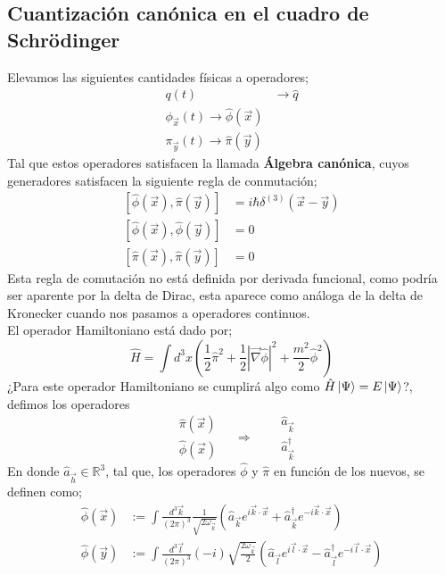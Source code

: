 \documentclass[../main.tex]{subfiles}
\begin{document}
\subsection{Cuantización canónica en el cuadro de Schrödinger}
Elevamos las siguientes cantidades físicas a operadores;
\begin{align}
  q(t) & \longrightarrow \hat{q} \\
  \phi_{\vec{x}}(t) \longrightarrow \hat{\phi}(\vec{x}) \\
  \pi_{\vec{y}}(t) \rightarrow \hat{\pi}(\vec{y})
\end{align}
Tal que estos operadores satisfacen la llamada \textbf{Álgebra canónica}, cuyos generadores satisfacen la siguiente regla de conmutación;
\begin{align}
  \left[ \hat{\phi}(\vec{x}) , \hat{\pi}(\vec{y}) \right] & = i\hbar \delta^{(3)}(\vec{x}-\vec{y}) \\
  \left[ \hat{\phi}(\vec{x}) , \hat{\phi}(\vec{y}) \right] & = 0 \\
   \left[ \hat{\pi}(\vec{x}) , \hat{\pi}(\vec{y}) \right] & = 0 
\end{align}
Esta regla de comutación no está definida por derivada funcional, como podría ser aparente por la delta de Dirac, esta aparece como análoga de la delta de Kronecker cuando nos pasamos a operadores continuos. \\
El operador Hamiltoniano está dado por;
\begin{equation}
  \hat{H}  = \int d^3 x \left( \frac{1}{2}\hat{\pi}^2 + \frac{1}{2}|\vec{\nabla}\hat{\phi}|^2  + \frac{m^2}{2} \hat{\phi}^2\right)
 \end{equation}
¿Para este operador Hamiltoniano se cumplirá algo como $\hat{H}\ket{\Psi}= E \ket{\Psi}$?, defimos los operadores
\begin{equation}
  \begin{aligned}
    & \hat{\pi}(\vec{x}) \\
    & \hat{\phi}(\vec{x}) 
  \end{aligned} \quad
  \Rightarrow \quad \begin{aligned}
    & \hat{a}_{\vec{k}} \\
    & \hat{a}^\dagger_{\vec{k}}
  \end{aligned}
\end{equation}
En donde $\hat{a}_{\vec{h}} \in \mathbb{R}^3$, tal que, los operadores $\hat{\phi}$  y $\hat{\pi}$ en función de los nuevos, se definen como;
\begin{align}
  \hat{\phi}(\vec{x}) & := \int \frac{d^3\vec{k}}{(2\pi)^3} \frac{1}{\sqrt{2\omega_{\vec{k}}}} \left( \hat{a}_{\vec{k}}e^{i\vec{k}\cdot \vec{x}} + \hat{a}_{\vec{k}}^\dagger e^{-i\vec{k}\cdot \vec{x}} \right) \\
  \hat{\phi}(\vec{y}) & := \int \frac{d^3\vec{l}}{(2\pi)^3} (-i)\sqrt{\frac{2\omega_{\vec{k}}}{2}}\left( \hat{a}_{\vec{l}}e^{i\vec{l}\cdot \vec{x}} - \hat{a}_{\vec{l}}^\dagger e^{-i\vec{l}\cdot \vec{x}} \right)
\end{align}
\end{document}
